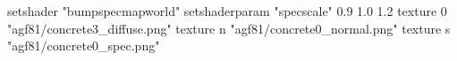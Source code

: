 setshader "bumpspecmapworld"
setshaderparam "specscale" 0.9 1.0 1.2
   texture 0 "agf81/concrete3_diffuse.png"
   texture n "agf81/concrete0_normal.png"
   texture s "agf81/concrete0_spec.png"
